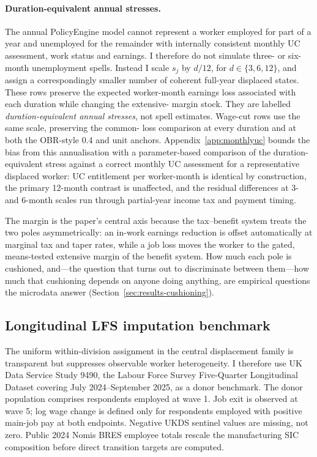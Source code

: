 \paragraph{Duration-equivalent annual stresses.} The annual PolicyEngine model
cannot represent a worker employed for part of a year and unemployed for the
remainder with internally consistent monthly UC assessment, work status and
earnings. I therefore do not simulate three- or six-month unemployment
spells. Instead I scale $s_j$ by $d/12$, for
$d\in\{3,6,12\}$, and assign a correspondingly smaller number of coherent
full-year displaced states. These rows preserve the expected worker-month
earnings loss associated with each duration while changing the extensive-
margin stock. They are labelled \emph{duration-equivalent annual stresses},
not spell estimates. Wage-cut rows use the same scale, preserving the common-
loss comparison at every duration and at both the OBR-style 0.4 and unit
anchors. Appendix~\ref{app:monthlyuc} bounds the bias from this annualisation
with a parameter-based comparison of the duration-equivalent stress against a
correct monthly UC assessment for a representative displaced worker: UC
entitlement per worker-month is identical by construction, the primary
12-month contrast is unaffected, and the residual differences at 3- and
6-month scales run through partial-year income tax and payment timing.

The margin is the paper's central axis because the tax--benefit system treats the two poles asymmetrically: an in-work earnings reduction is offset automatically at marginal tax and taper rates, while a job loss moves the worker to the gated, means-tested extensive margin of the benefit system. How much each pole is cushioned, and---the question that turns out to discriminate between them---how much that cushioning depends on anyone doing anything, are empirical questions the microdata answer (Section~\ref{sec:results-cushioning}).

\subsection{Longitudinal LFS imputation benchmark}\label{sec:method-lfs}

The uniform within-division assignment in the central displacement family is
transparent but suppresses observable worker heterogeneity. I therefore use
UK Data Service Study 9490, the Labour Force Survey Five-Quarter Longitudinal
Dataset covering July 2024--September 2025, as a donor benchmark. The donor
population comprises respondents employed at wave 1. Job exit is observed at
wave 5; log wage change is defined only for respondents employed with
positive main-job pay at both endpoints. Negative UKDS sentinel values are
missing, not zero. Public 2024 Nomis BRES employee totals rescale the
manufacturing SIC composition before direct transition targets are computed.
\citep{onslfs9490}


